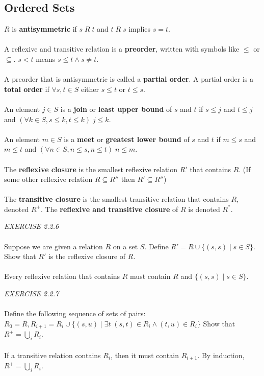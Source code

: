 \documentclass{article}
\begin{document}
\subsection{Ordered Sets}
\(R\) is \textbf{antisymmetric} if \(s\;R\; t\) and \(t\;R\; s\) implies \(s=t\).\\\\
A reflexive and transitive relation is a \textbf{preorder}, written with symbols like \(\le\) or \(\subseteq\). \(s<t\) means \(s\le t\land s\neq t\).\\\\
A preorder that is antisymmetric is called a \textbf{partial order}. A partial order is a \textbf{total order} if \(\forall s,t\in S\) either \(s\le t\) or \(t\le s\).\\\\
An element \(j\in S\) is a \textbf{join} or \textbf{least upper bound} of \(s\) and \(t\) if \(s\le j\) and \(t\le j\) and \((\forall k\in S,s\le k,t\le k)\;j\le k\).\\\\
An element \(m\in S\) is a \textbf{meet} or \textbf{greatest lower bound} of \(s\) and \(t\) if \(m\le s\) and \(m\le t\) and \((\forall n\in S,n\le s,n\le t)\;n\le m\).\\\\
The \textbf{reflexive closure} is the smallest reflexive relation \(R'\) that contains \(R\). (If some other reflexive relation \(R\subseteq R''\) then \(R'\subseteq R''\))\\\\
The \textbf{transitive closure} is the smallest transitive relation that contains \(R\), denoted \(R^{+}\). The \textbf{reflexive and transitive closure} of \(R\) is denoted \(R^{*}\).\\
\begin{siderules}\color{blue}\textit{EXERCISE 2.2.6}\color{black}\\\\
\color{blue}Suppose we are given a relation \(R\) on a set \(S\). Define \(R'=R\cup\{(s,s)\;|\;s\in S\}\). Show that \(R'\) is the reflexive closure of \(R\).\\\\\color{black}
Every reflexive relation that contains \(R\) must contain \(R\) and \(\{(s,s)\;|\;s\in S\}\).
\end{siderules}
\begin{siderules}\color{blue}\textit{EXERCISE 2.2.7}\color{black}\\\\
\color{blue} Define the following sequence of sets of pairs: \(R_{0}=R,R_{i+1}=R_{i}\cup\{(s,u)\;|\;\exists t\;(s,t)\in R_{i}\land (t,u)\in R_{i}\}\)
Show that \(R^{+}=\bigcup_{i}R_{i}\).\\\\\color{black}
If a transitive relation contains \(R_{i}\), then it must contain \(R_{i+1}\). By induction, \(R^{+}=\bigcup_{i}R_{i}\).
\end{siderules}
\end{document}
